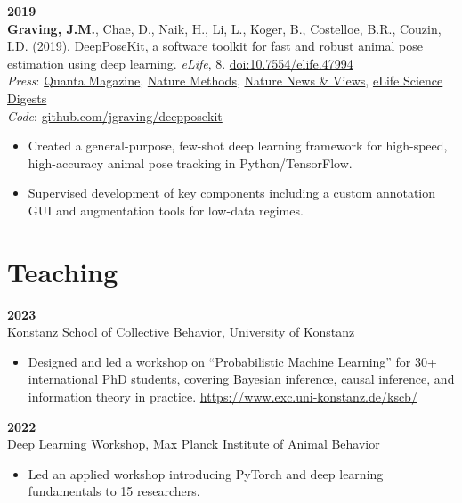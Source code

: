 \documentclass[10pt,a4paper]{article}
\begin{document}
	\vspace{4pt}
	\textbf{2019}\\
	\textbf{Graving, J.M.}, Chae, D., Naik, H., Li, L., Koger, B., Costelloe, B.R., Couzin, I.D. (2019). DeepPoseKit, a software toolkit for fast and robust animal pose estimation using deep learning. \textit{eLife}, 8. \href{https://doi.org/10.7554/elife.47994}{doi:10.7554/elife.47994} \\
	\textit{Press}: \href{https://www.quantamagazine.org/to-decode-the-brain-scientists-automate-the-study-of-behavior-20191210/}{Quanta Magazine}, 
	\href{https://doi.org/10.1038/s41592-019-0678-2}{Nature Methods},
	\href{https://doi.org/10.1038/d41586-019-02942-5}{Nature News \& Views},
	\href{https://elifesciences.org/digests/47994/machine-learning-animal-poses-to-understand-behavior}{eLife Science Digests} \\
	\textit{Code}: \href{https://github.com/jgraving/deepposekit}{github.com/jgraving/deepposekit}
	\begin{itemize}
		\item Created a general-purpose, few-shot deep learning framework for high-speed, high-accuracy animal pose tracking in Python/TensorFlow.
		\item Supervised development of key components including a custom annotation GUI and augmentation tools for low-data regimes.
	\end{itemize}
	
	\section*{Teaching}
	\textbf{2023}\\
	Konstanz School of Collective Behavior, University of Konstanz
	\begin{itemize}
		\item Designed and led a workshop on “Probabilistic Machine Learning” for 30+ international PhD students, covering Bayesian inference, causal inference, and information theory in practice. \href{https://www.exc.uni-konstanz.de/kscb/}{https://www.exc.uni-konstanz.de/kscb/}
	\end{itemize}
	
	\vspace{4pt}
	\textbf{2022}\\
	Deep Learning Workshop, Max Planck Institute of Animal Behavior
	\begin{itemize}
		\item Led an applied workshop introducing PyTorch and deep learning fundamentals to 15 researchers.
	\end{itemize}
	
\end{document}
